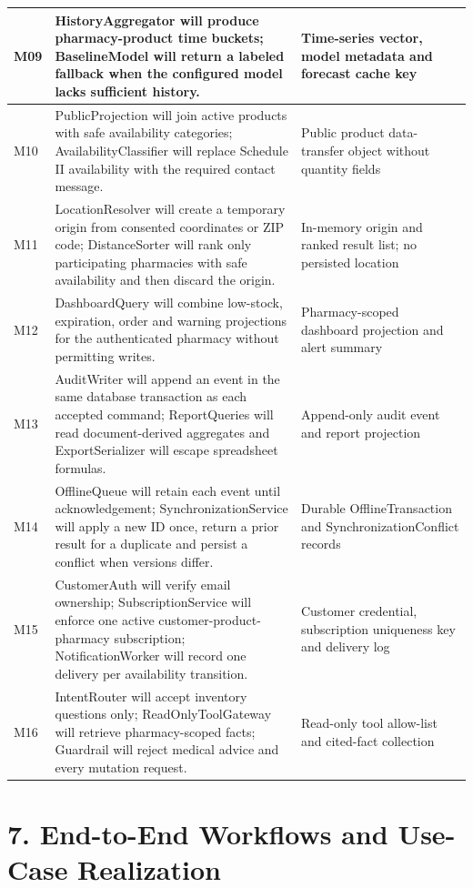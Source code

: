 {\begin{longtable}[]{|
  >{\raggedright\arraybackslash}m{.10\linewidth}|
  >{\raggedright\arraybackslash}m{.49\linewidth}|
  >{\raggedright\arraybackslash}m{.31\linewidth}|}
M09 & HistoryAggregator will produce pharmacy-product time buckets; BaselineModel will return a labeled fallback when the configured model lacks sufficient history. & Time-series vector, model metadata and forecast cache key \\ \hline
M10 & PublicProjection will join active products with safe availability categories; AvailabilityClassifier will replace Schedule II availability with the required contact message. & Public product data-transfer object without quantity fields \\ \hline
M11 & LocationResolver will create a temporary origin from consented coordinates or ZIP code; DistanceSorter will rank only participating pharmacies with safe availability and then discard the origin. & In-memory origin and ranked result list; no persisted location \\ \hline
M12 & DashboardQuery will combine low-stock, expiration, order and warning projections for the authenticated pharmacy without permitting writes. & Pharmacy-scoped dashboard projection and alert summary \\ \hline
M13 & AuditWriter will append an event in the same database transaction as each accepted command; ReportQueries will read document-derived aggregates and ExportSerializer will escape spreadsheet formulas. & Append-only audit event and report projection \\ \hline
M14 & OfflineQueue will retain each event until acknowledgement; SynchronizationService will apply a new ID once, return a prior result for a duplicate and persist a conflict when versions differ. & Durable OfflineTransaction and SynchronizationConflict records \\ \hline
M15 & CustomerAuth will verify email ownership; SubscriptionService will enforce one active customer-product-pharmacy subscription; NotificationWorker will record one delivery per availability transition. & Customer credential, subscription uniqueness key and delivery log \\ \hline
M16 & IntentRouter will accept inventory questions only; ReadOnlyToolGateway will retrieve pharmacy-scoped facts; Guardrail will reject medical advice and every mutation request. & Read-only tool allow-list and cited-fact collection \\ \hline
\end{longtable}
}

\clearpage
\section{7. End-to-End Workflows and Use-Case Realization}\label{end-to-end-workflows-and-use-case-realization}

